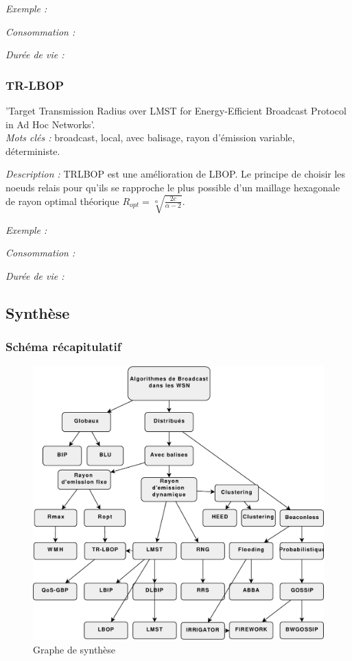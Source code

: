\emph{Exemple :} 

\emph{Consommation :} 

\emph{Durée de vie :} 


\subsubsection{TR-LBOP \cite{Ingelrest2004}}
'Target Transmission Radius over LMST for Energy-Efficient Broadcast Protocol in Ad Hoc Networks'.\\
\emph{Mots clés :} broadcast, local, avec balisage, rayon d'émission variable, déterministe.

\emph{Description :} TRLBOP est une amélioration de LBOP. Le principe de choisir les noeuds relais pour qu'ils se rapproche le plus possible d'un maillage
 hexagonale de rayon optimal théorique $R_{opt}=\sqrt[\alpha]{\frac{2c}{\alpha-2}}$.


\emph{Exemple :} 

\emph{Consommation :} 

\emph{Durée de vie :} 







\subsection{Synthèse}

\subsubsection{Schéma récapitulatif}
\begin{figure}[H]
\centering
\includegraphics[scale=0.8]{Etat_de_l'art/source/classification}
\caption{Graphe de synthèse}
\end{figure} 

